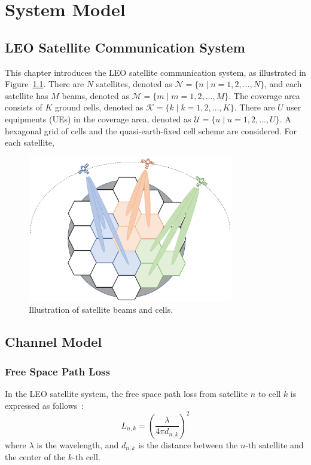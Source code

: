 \chapter{System Model}
\label{chap:model}

\section{LEO Satellite Communication System}
This chapter introduces the LEO satellite communication system, as illustrated in Figure~\ref{fig_system}. There are $N$ satellites, denoted as $\mathcal{N} = \{n \mid n = 1, 2, \ldots, N\}$, and each satellite has $M$ beams, denoted as $\mathcal{M} = \{m \mid m = 1, 2, \ldots, M\}$. The coverage area consists of $K$ ground cells, denoted as $\mathcal{K} = \{k \mid k = 1, 2, \ldots, K\}$. There are $U$ user equipments (UEs) in the coverage area, denoted as $\mathcal{U} = \{u \mid u = 1, 2, \ldots, U\}$. A hexagonal grid of cells and the quasi-earth-fixed cell scheme are considered. For each satellite, 

\begin{figure}[h!]
    \centering
    \includegraphics[width=0.8\textwidth]{figure/system overview.pdf}
    \caption{Illustration of satellite beams and cells.}
    \label{fig_system}
\end{figure}

\section{Channel Model}

\subsection{Free Space Path Loss}
In the LEO satellite system, the free space path loss from satellite $n$ to cell $k$ is expressed as follows~\cite{Satellite-Multi-Beam}:
\begin{equation}
    L_{n,k} = \left(\frac{\lambda}{4\pi d_{n,k}}\right)^2
\end{equation}
where $\lambda$ is the wavelength, and $d_{n,k}$ is the distance between the $n$-th satellite and the center of the $k$-th cell.

